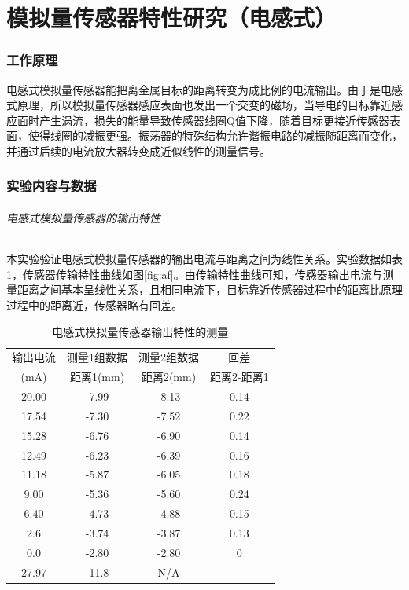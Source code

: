 \part{模拟量传感器特性研究（电感式）}
\section{工作原理}
电感式模拟量传感器能把离金属目标的距离转变为成比例的电流输出。由于是电感式原理，所以模拟量传感器感应表面也发出一个交变的磁场，当导电的目标靠近感应面时产生涡流，损失的能量导致传感器线圈Q值下降，随着目标更接近传感器表面，使得线圈的减振更强。振荡器的特殊结构允许谐振电路的减振随距离而变化，并通过后续的电流放大器转变成近似线性的测量信号。
\section{实验内容与数据}
\paragraph{电感式模拟量传感器的输出特性}
本实验验证电感式模拟量传感器的输出电流与距离之间为线性关系。实验数据如表\ref{tab:ao}，传感器传输特性曲线如图\ref{fig:af}。由传输特性曲线可知，传感器输出电流与测量距离之间基本呈线性关系，且相同电流下，目标靠近传感器过程中的距离比原理过程中的距离近，传感器略有回差。
\begin{table}[htbp]
	\centering
	\begin{tabular}{|c|c|c|c|}
		\hline
		输出电流 & 测量1组数据 & 测量2组数据 & 回差 \\
		(mA) & 距离1(mm) & 距离2(mm) & 距离2-距离1 \\
		\hline
		20.00 & -7.99 & -8.13 & 0.14 \\
		17.54 & -7.30 & -7.52 & 0.22 \\
		15.28 & -6.76 & -6.90 & 0.14 \\
		12.49 & -6.23 & -6.39 & 0.16 \\
		11.18 & -5.87 & -6.05 & 0.18 \\
		9.00 & -5.36 & -5.60 & 0.24 \\
		6.40 & -4.73 & -4.88 & 0.15 \\
		2.6 & -3.74 & -3.87 & 0.13 \\
		0.0 & -2.80 & -2.80 & 0 \\
		27.97 & -11.8 & N/A &  \\
		\hline
	\end{tabular}
	\caption{电感式模拟量传感器输出特性的测量}
	\label{tab:ao}
\end{table}

